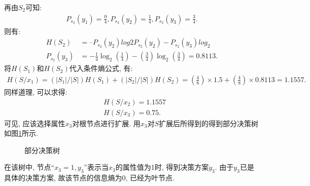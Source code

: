 再由$S_2$可知:
\begin{align}
  P_{s_2}(y_1)=\frac 0 4, P_{s_2}(y_2)=\frac 1 4, P_{s_2}(y_3)=\frac 3 4.
\end{align}
则有:
\begin{align}
    H(S_2)&=– P_{s_2}(y_2)log2 P_{s_2}(y_2 )- P_{s_2}(y_3)log_2\\
    P_{s_2}(y_3)&=-\frac 1 4\log_2\left(\frac 1 4\right)- \left(\frac 3 4\right)\log_2\left(\frac 3 4\right) =0.8113.
\end{align}
将$H(S_1)$和$H(S_2)$代入条件熵公式, 有:
\begin{align}
    H(S/x_1)=(|S_1|/|S|)H(S_1)+ (|S_2|/|S|)H(S_2)=\left(\frac 4 8\right)\times 1.5+\left(\frac 4 8\right)\times 0.8113 =1.1557.
\end{align}
同样道理, 可以求得:
\begin{align}
  &H(S/x_2)=1.1557\\
  &H(S/x_3)=0.75.
\end{align}
可见, 应该选择属性$x_3$对根节点进行扩展. 用$x_3$对$S$扩展后所得到的得到部分决策树如图\ref{bufenjueceshu2019112901}所示.
\begin{figure}[H]
\begin{center}
\caption{部分决策树}
\label{bufenjueceshu2019112901}
\end{center}
\end{figure}
在该树中, 节点“$x_3=1, y_3$”表示当$x_3$的属性值为1时, 得到决策方案$y_3$. 由于$y_3$已是具体的决策方案, 故该节点的信息熵为0, 已经为叶节点.

